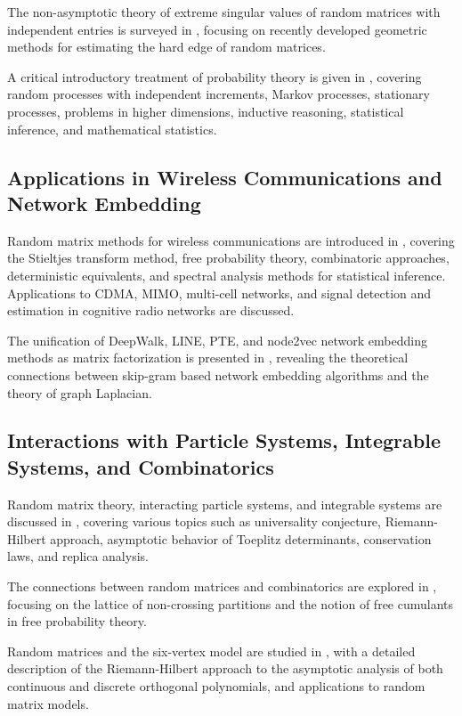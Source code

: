 \documentclass{article}
\begin{document}
The non-asymptotic theory of extreme singular values of random matrices with independent entries is surveyed in \cite{Rudelson2010NonasymptoticTO}, focusing on recently developed geometric methods for estimating the hard edge of random matrices.

A critical introductory treatment of probability theory is given in \cite{Finetti2017TheoryOP}, covering random processes with independent increments, Markov processes, stationary processes, problems in higher dimensions, inductive reasoning, statistical inference, and mathematical statistics.

\subsection{Applications in Wireless Communications and Network Embedding}

Random matrix methods for wireless communications are introduced in \cite{Couillet2011RandomMM}, covering the Stieltjes transform method, free probability theory, combinatoric approaches, deterministic equivalents, and spectral analysis methods for statistical inference. Applications to CDMA, MIMO, multi-cell networks, and signal detection and estimation in cognitive radio networks are discussed.

The unification of DeepWalk, LINE, PTE, and node2vec network embedding methods as matrix factorization is presented in \cite{Qiu2017NetworkEA}, revealing the theoretical connections between skip-gram based network embedding algorithms and the theory of graph Laplacian.

\subsection{Interactions with Particle Systems, Integrable Systems, and Combinatorics}

Random matrix theory, interacting particle systems, and integrable systems are discussed in \cite{Deift2014RandomMT}, covering various topics such as universality conjecture, Riemann-Hilbert approach, asymptotic behavior of Toeplitz determinants, conservation laws, and replica analysis.

The connections between random matrices and combinatorics are explored in \cite{Speicher2016RandomMA}, focusing on the lattice of non-crossing partitions and the notion of free cumulants in free probability theory.

Random matrices and the six-vertex model are studied in \cite{Bleher2013RandomMA}, with a detailed description of the Riemann-Hilbert approach to the asymptotic analysis of both continuous and discrete orthogonal polynomials, and applications to random matrix models.
\end{document}
